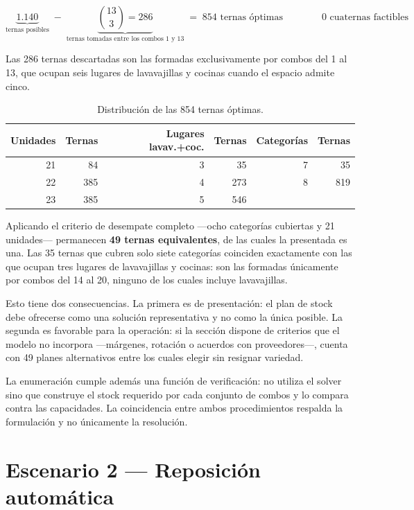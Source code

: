 \documentclass[10pt,a4paper]{article}
\begin{document}
\[
\underbrace{1.140}_{\text{ternas posibles}} \;-\;
\underbrace{\binom{13}{3} = 286}_{\text{ternas tomadas entre los combos 1 y 13}}
\;=\; \boxed{854 \text{ ternas óptimas}}
\qquad\qquad
0 \text{ cuaternas factibles}
\]

Las 286 ternas descartadas son las formadas exclusivamente por combos del 1 al
13, que ocupan seis lugares de lavavajillas y cocinas cuando el espacio admite
cinco.

\begin{table}[H]
\centering\small
\caption{Distribución de las 854 ternas óptimas.}
\label{tab:distribucion_e1}
\begin{tabular}{rr@{\qquad\qquad}rr@{\qquad\qquad}rr}
\toprule
\textbf{Unidades} & \textbf{Ternas} & \textbf{Lugares lavav.+coc.} & \textbf{Ternas} & \textbf{Categorías} & \textbf{Ternas} \\
\midrule
21 & 84  & 3 & 35  & 7 & 35 \\
22 & 385 & 4 & 273 & 8 & 819 \\
23 & 385 & 5 & 546 &   & \\
\bottomrule
\end{tabular}
\end{table}

Aplicando el criterio de desempate completo —ocho categorías cubiertas y 21
unidades— permanecen \textbf{49 ternas equivalentes}, de las cuales la
presentada es una. Las 35 ternas que cubren solo siete categorías coinciden
exactamente con las que ocupan tres lugares de lavavajillas y cocinas: son las
formadas únicamente por combos del 14 al 20, ninguno de los cuales incluye
lavavajillas.

Esto tiene dos consecuencias. La primera es de presentación: el plan de stock
debe ofrecerse como una solución representativa y no como la única posible. La
segunda es favorable para la operación: si la sección dispone de criterios que
el modelo no incorpora —márgenes, rotación o acuerdos con proveedores—, cuenta
con 49 planes alternativos entre los cuales elegir sin resignar variedad.

La enumeración cumple además una función de verificación: no utiliza el solver
sino que construye el stock requerido por cada conjunto de combos y lo compara
contra las capacidades. La coincidencia entre ambos procedimientos respalda la
formulación y no únicamente la resolución.

\section{Escenario 2 — Reposición automática}
\label{sec:esc2}
\end{document}
